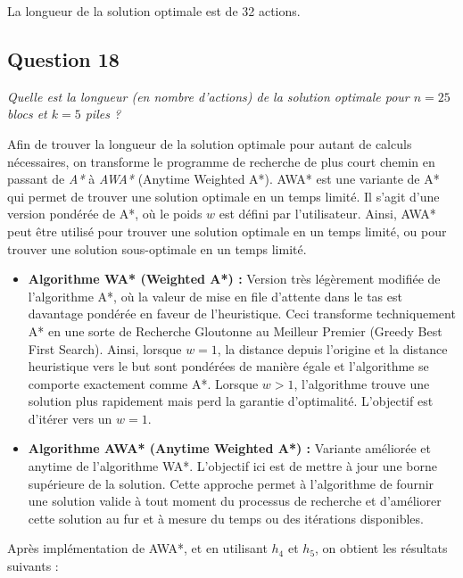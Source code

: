 La longueur de la solution optimale est de 32 actions.

\subsection{Question 18}

\textit{Quelle est la longueur (en nombre d'actions) de la solution optimale pour $n = 25$ blocs et $k = 5$ piles ?}

Afin de trouver la longueur de la solution optimale pour autant de calculs nécessaires, on transforme le programme de recherche de plus court chemin en passant de \textit{A*} à \textit{AWA*} (Anytime Weighted A*). AWA* est une variante de A* qui permet de trouver une solution optimale en un temps limité. Il s'agit d'une version pondérée de A*, où le poids $w$ est défini par l'utilisateur. Ainsi, AWA* peut être utilisé pour trouver une solution optimale en un temps limité, ou pour trouver une solution sous-optimale en un temps limité.

\begin{itemize}
    \item \textbf{Algorithme WA* (Weighted A*) :} Version très légèrement modifiée de l'algorithme A*, où la valeur de mise en file d'attente dans le tas est davantage pondérée en faveur de l'heuristique. Ceci transforme techniquement A* en une sorte de Recherche Gloutonne au Meilleur Premier (Greedy Best First Search). Ainsi, lorsque \(w = 1\), la distance depuis l'origine et la distance heuristique vers le but sont pondérées de manière égale et l'algorithme se comporte exactement comme A*. Lorsque \(w > 1\), l'algorithme trouve une solution plus rapidement mais perd la garantie d'optimalité. L'objectif est d'itérer vers un \(w = 1\).
    
    \item \textbf{Algorithme AWA* (Anytime Weighted A*) :} Variante améliorée et anytime de l'algorithme WA*. L'objectif ici est de mettre à jour une borne supérieure de la solution. Cette approche permet à l'algorithme de fournir une solution valide à tout moment du processus de recherche et d'améliorer cette solution au fur et à mesure du temps ou des itérations disponibles.
\end{itemize}

Après implémentation de AWA*, et en utilisant $h_4$ et $h_5$, on obtient les résultats suivants :

